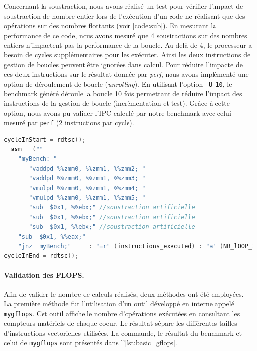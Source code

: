             Concernant la soustraction, nous avons réalisé un test pour vérifier l'impact de soustraction de nombre entier lors de l'exécution d'un code ne réalisant que des opérations sur des nombres flottants (voir \autoref{code:sub}). En mesurant la performance de ce code, nous avons mesuré que 4 soustractions sur des nombres entiers n'impactent pas la performance de la boucle. Au-delà de 4, le processeur a besoin de cycles supplémentaires pour les exécuter. Ainsi les deux instructions de gestion de boucles peuvent être ignorées dans calcul. Pour réduire l'impacte de ces deux instructions sur le résultat donnée par \textit{perf}, nous avons implémenté une option de déroulement de boucle (\textit{unrolling}). En utilisant l'option \verb|-U 10|, le benchmark généré déroule la boucle 10 fois permettant de réduire l'impact des instructions de la gestion de boucle (incrémentation et test). Grâce à cette option, nous avons pu valider l'IPC calculé par notre benchmark avec celui mesuré par \verb|perf| (2 instructions par cycle).
        
            \begin{minipage}{0.965\linewidth}         \begin{lstlisting}[label=code:sub ,language=C, caption={En ajoutant jusqu'à 3 soustractions, nous avons pu vérifier que la soustraction utilisée pour la gestion de la boucle n'avait aucun impact sur la performance du benchmark. En effet, la soustraction sur un nombre entier n'utilise pas la FPU.}]
cycleInStart = rdtsc();
__asm__ ("" 
    "myBench: " 
       "vaddpd %%zmm0, %%zmm1, %%zmm2; "
       "vaddpd %%zmm0, %%zmm1, %%zmm3; "
       "vmulpd %%zmm0, %%zmm1, %%zmm4; "
       "vmulpd %%zmm0, %%zmm1, %%zmm5; "
       "sub  $0x1, %%ebx;" //soustraction artificielle
       "sub  $0x1, %%ebx;" //soustraction artificielle
       "sub  $0x1, %%ebx;" //soustraction artificielle
    "sub  $0x1, %%eax;"
    "jnz  myBench;"		: "=r" (instructions_executed) : "a" (NB_lOOP_IN));
cycleInEnd = rdtsc();
\end{lstlisting} \end{minipage}
        
        
        \paragraph{Validation des FLOPS.} 
            Afin de valider le nombre de calculs réalisés, deux méthodes ont été employées.
            La première méthode fut l'utilisation d'un outil développé en interne appelé \verb=mygflops=. Cet outil affiche le nombre d'opérations exécutées en consultant les compteurs matériels de chaque coeur. Le résultat sépare les différentes tailles d'instructions vectorielles utilisées. La commande, le résultat du benchmark et celui de \verb=mygflops= sont présentés dans l'\autoref{lst:basic_gflops}. 
        
